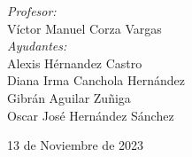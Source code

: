 \begin{titlepage}
    \vspace{10mm}
    \begin{minipage}{0.7\textwidth}
        \begin{flushleft} \large
            \emph{Profesor:}\\
                Víctor Manuel Corza Vargas\\
                \vspace{3mm}
                \emph{Ayudantes:}\\
                Alexis Hérnandez Castro \\
                Diana Irma Canchola Hernández \\
                Gibrán Aguilar Zuñiga \\
                Oscar José Hernández Sánchez 
        \end{flushleft}
    \end{minipage}
    
    \makeatother
    {\large 13 de Noviembre de 2023}\\[2cm]
    \vfill 
\end{titlepage}